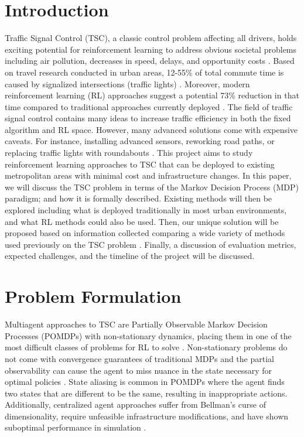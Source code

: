 \documentclass[letterpaper]{article} %
\begin{document}
\section{Introduction}
Traffic Signal Control (TSC), a classic control problem affecting all drivers, holds exciting potential for reinforcement learning to address obvious societal problems including air pollution, decreases in speed, delays, and opportunity costs \cite{Almeida2022MultiagentRL}.
Based on travel research conducted in urban areas, 12-55\% of total commute time is caused by signalized intersections (traffic lights) \cite{ault2021reinforcement}.
Moreover, modern reinforcement learning (RL) approaches suggest a potential 73\% reduction in that time compared to traditional approaches currently deployed \cite{ault2021reinforcement}.
The field of traffic signal control contains many ideas to increase traffic efficiency in both the fixed algorithm and RL space.
However, many advanced solutions come with expensive caveats. For instance, installing advanced sensors, reworking road paths, or replacing traffic lights with roundabouts \cite{DBLP:journals/corr/abs-2004-04778}.
This project aims to study reinforcement learning approaches to TSC that can be deployed to existing metropolitan areas with minimal cost and infrastructure changes.
In this paper, we will discuss the TSC problem in terms of the Markov Decision Process (MDP) paradigm; and how it is formally described.
Existing methods will then be explored including what is deployed traditionally in most urban environments, and what RL methods could also be used.
Then, our unique solution will be proposed based on information collected comparing a wide variety of methods used previously on the TSC problem \cite{hafiz2020deep} \cite{ault2021reinforcement} \cite{Ghanadbashi2023}.
Finally, a discussion of evaluation metrics, expected challenges, and the timeline of the project will be discussed.

\section{Problem Formulation}
Multiagent approaches to TSC are Partially Observable Markov Decision Processes (POMDPs) with non-stationary dynamics, placing them in one of the most difficult classes of problems for RL to solve \cite{Almeida2022MultiagentRL} \cite{DBLP:journals/corr/abs-2004-04778} \cite{choi1999environment}.
Non-stationary problems do not come with convergence guarantees of traditional MDPs and the partial observability can cause the agent to miss nuance in the state necessary for optimal policies \cite{choi1999environment} \cite{10.3389/frai.2022.805823}.
State aliasing is common in POMDPs where the agent finds two states that are different to be the same, resulting in inappropriate actions.
Additionally, centralized agent approaches suffer from Bellman's curse of dimensionality, require unfeasible infrastructure modifications, and have shown suboptimal performance in simulation \cite{DBLP:journals/corr/abs-2004-04778} \cite{ault2021reinforcement}.
\end{document}
